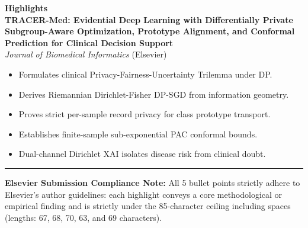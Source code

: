 \documentclass[11pt,a4paper]{article}
\begin{document}
\begin{center}
{\Large \textbf{Highlights}} \\[0.5em]
{\large \textbf{TRACER-Med: Evidential Deep Learning with Differentially Private Subgroup-Aware Optimization, Prototype Alignment, and Conformal Prediction for Clinical Decision Support}} \\[0.3em]
\emph{Journal of Biomedical Informatics} (Elsevier)
\end{center}

\vspace{1.5em}

\begin{itemize}[leftmargin=*,itemsep=8pt]
    \item Formulates clinical Privacy-Fairness-Uncertainty Trilemma under DP.
    \item Derives Riemannian Dirichlet-Fisher DP-SGD from information geometry.
    \item Proves strict per-sample record privacy for class prototype transport.
    \item Establishes finite-sample sub-exponential PAC conformal bounds.
    \item Dual-channel Dirichlet XAI isolates disease risk from clinical doubt.
\end{itemize}

\vspace{2em}
\noindent\rule{\linewidth}{0.4pt}
\vspace{0.5em}
\footnotesize
\textbf{Elsevier Submission Compliance Note:}
All 5 bullet points strictly adhere to Elsevier's author guidelines: each highlight conveys a core methodological or empirical finding and is strictly under the 85-character ceiling including spaces (lengths: 67, 68, 70, 63, and 69 characters).
\end{document}
